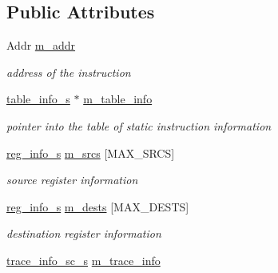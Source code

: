 \subsection*{Public Attributes}
\begin{DoxyCompactItemize}
\item 
\hypertarget{classinst__info__s_ae89bd82fdcaf1ea206c2dcddfbd7c38c}{
Addr \hyperlink{classinst__info__s_ae89bd82fdcaf1ea206c2dcddfbd7c38c}{m\_\-addr}}
\label{classinst__info__s_ae89bd82fdcaf1ea206c2dcddfbd7c38c}

\begin{DoxyCompactList}\small\item\em address of the instruction \item\end{DoxyCompactList}\item 
\hypertarget{classinst__info__s_a4fa3fdbbbd9f588e9cac1f794cca501e}{
\hyperlink{structtable__info__s}{table\_\-info\_\-s} $\ast$ \hyperlink{classinst__info__s_a4fa3fdbbbd9f588e9cac1f794cca501e}{m\_\-table\_\-info}}
\label{classinst__info__s_a4fa3fdbbbd9f588e9cac1f794cca501e}

\begin{DoxyCompactList}\small\item\em pointer into the table of static instruction information \item\end{DoxyCompactList}\item 
\hypertarget{classinst__info__s_afe1ca95a30593d0d644bb86e374d1770}{
\hyperlink{structreg__info__s}{reg\_\-info\_\-s} \hyperlink{classinst__info__s_afe1ca95a30593d0d644bb86e374d1770}{m\_\-srcs} \mbox{[}MAX\_\-SRCS\mbox{]}}
\label{classinst__info__s_afe1ca95a30593d0d644bb86e374d1770}

\begin{DoxyCompactList}\small\item\em source register information \item\end{DoxyCompactList}\item 
\hypertarget{classinst__info__s_a12e62772f5aa8b0a797af072578dd36c}{
\hyperlink{structreg__info__s}{reg\_\-info\_\-s} \hyperlink{classinst__info__s_a12e62772f5aa8b0a797af072578dd36c}{m\_\-dests} \mbox{[}MAX\_\-DESTS\mbox{]}}
\label{classinst__info__s_a12e62772f5aa8b0a797af072578dd36c}

\begin{DoxyCompactList}\small\item\em destination register information \item\end{DoxyCompactList}\item 
\hypertarget{classinst__info__s_a98186f8487396b4df99d7658906cd3b8}{
\hyperlink{structtrace__info__sc__s}{trace\_\-info\_\-sc\_\-s} \hyperlink{classinst__info__s_a98186f8487396b4df99d7658906cd3b8}{m\_\-trace\_\-info}}
\label{classinst__info__s_a98186f8487396b4df99d7658906cd3b8}


\end{DoxyCompactItemize}
